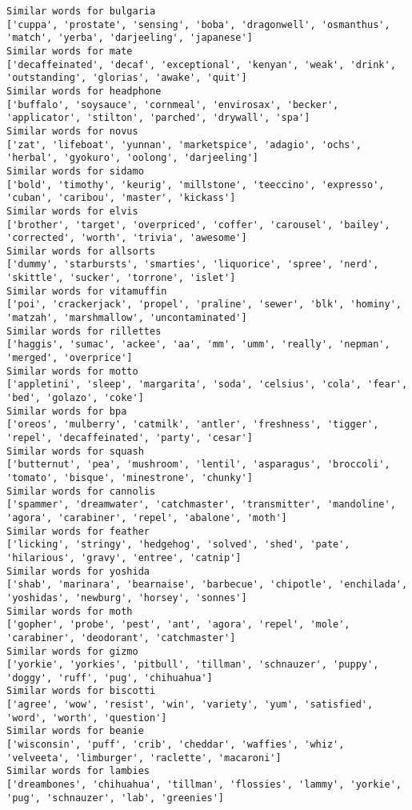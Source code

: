 \documentclass[11pt]{article}
\begin{document}
\begin{Verbatim}[commandchars=\\\{\}]
Similar words for bulgaria
['cuppa', 'prostate', 'sensing', 'boba', 'dragonwell', 'osmanthus', 'match', 'yerba', 'darjeeling', 'japanese']
Similar words for mate
['decaffeinated', 'decaf', 'exceptional', 'kenyan', 'weak', 'drink', 'outstanding', 'glorias', 'awake', 'quit']
Similar words for headphone
['buffalo', 'soysauce', 'cornmeal', 'envirosax', 'becker', 'applicator', 'stilton', 'parched', 'drywall', 'spa']
Similar words for novus
['zat', 'lifeboat', 'yunnan', 'marketspice', 'adagio', 'ochs', 'herbal', 'gyokuro', 'oolong', 'darjeeling']
Similar words for sidamo
['bold', 'timothy', 'keurig', 'millstone', 'teeccino', 'expresso', 'cuban', 'caribou', 'master', 'kickass']
Similar words for elvis
['brother', 'target', 'overpriced', 'coffer', 'carousel', 'bailey', 'corrected', 'worth', 'trivia', 'awesome']
Similar words for allsorts
['dummy', 'starbursts', 'smarties', 'liquorice', 'spree', 'nerd', 'skittle', 'sucker', 'torrone', 'islet']
Similar words for vitamuffin
['poi', 'crackerjack', 'propel', 'praline', 'sewer', 'blk', 'hominy', 'matzah', 'marshmallow', 'uncontaminated']
Similar words for rillettes
['haggis', 'sumac', 'ackee', 'aa', 'mm', 'umm', 'really', 'nepman', 'merged', 'overprice']
Similar words for motto
['appletini', 'sleep', 'margarita', 'soda', 'celsius', 'cola', 'fear', 'bed', 'golazo', 'coke']
Similar words for bpa
['oreos', 'mulberry', 'catmilk', 'antler', 'freshness', 'tigger', 'repel', 'decaffeinated', 'party', 'cesar']
Similar words for squash
['butternut', 'pea', 'mushroom', 'lentil', 'asparagus', 'broccoli', 'tomato', 'bisque', 'minestrone', 'chunky']
Similar words for cannolis
['spammer', 'dreamwater', 'catchmaster', 'transmitter', 'mandoline', 'agora', 'carabiner', 'repel', 'abalone', 'moth']
Similar words for feather
['licking', 'stringy', 'hedgehog', 'solved', 'shed', 'pate', 'hilarious', 'gravy', 'entree', 'catnip']
Similar words for yoshida
['shab', 'marinara', 'bearnaise', 'barbecue', 'chipotle', 'enchilada', 'yoshidas', 'newburg', 'horsey', 'sonnes']
Similar words for moth
['gopher', 'probe', 'pest', 'ant', 'agora', 'repel', 'mole', 'carabiner', 'deodorant', 'catchmaster']
Similar words for gizmo
['yorkie', 'yorkies', 'pitbull', 'tillman', 'schnauzer', 'puppy', 'doggy', 'ruff', 'pug', 'chihuahua']
Similar words for biscotti
['agree', 'wow', 'resist', 'win', 'variety', 'yum', 'satisfied', 'word', 'worth', 'question']
Similar words for beanie
['wisconsin', 'puff', 'crib', 'cheddar', 'waffies', 'whiz', 'velveeta', 'limburger', 'raclette', 'macaroni']
Similar words for lambies
['dreambones', 'chihuahua', 'tillman', 'flossies', 'lammy', 'yorkie', 'pug', 'schnauzer', 'lab', 'greenies']

\end{Verbatim}
\end{document}
